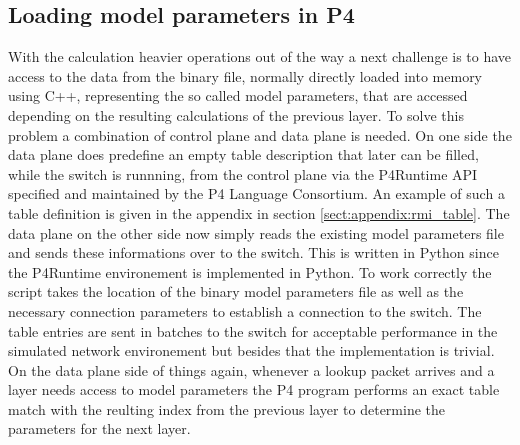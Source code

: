 \subsection{Loading model parameters in P4}
With the calculation heavier operations out of the way a next challenge is to have access to the data from the binary file, normally directly loaded into memory using C++, representing the so called model parameters, that are accessed depending on the resulting calculations of the previous layer. To solve this problem a combination of control plane and data plane is needed. On one side the data plane does predefine an empty table description that later can be filled, while the switch is runnning, from the control plane via the P4Runtime API \cite{p4runtime-spec} specified and maintained by the P4 Language Consortium. An example of such a table definition is given in the appendix in section \ref{sect:appendix:rmi_table}. The data plane on the other side now simply reads the existing model parameters file and sends these informations over to the switch. This is written in Python since the P4Runtime environement is implemented in Python. To work correctly the script takes the location of the binary model parameters file as well as the necessary connection parameters to establish a connection to the switch. The table entries are sent in batches to the switch for acceptable performance in the simulated network environement but besides that the implementation is trivial. On the data plane side of things again, whenever a lookup packet arrives and a layer needs access to model parameters the P4 program performs an exact table match with the reulting index from the previous layer to determine the parameters for the next layer.

